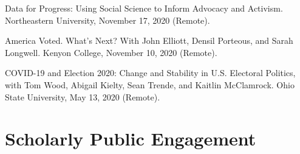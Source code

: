 \documentclass[letterpaper]{article}
\renewenvironment{itemize}{
  \begin{list}{}{
    \setlength{\leftmargin}{1.5em}
  }
}{
  \end{list}
}
\begin{document}
\begin{itemize}
\item Data for Progress: Using Social Science to Inform Advocacy and Activism. Northeastern University, November 17, 2020 (Remote). 

\item America Voted. What's Next? With John Elliott, Densil Porteous, and Sarah Longwell. Kenyon College, November 10, 2020 (Remote). 

\item COVID-19 and Election 2020: Change and Stability in U.S. Electoral Politics, with Tom Wood, Abigail Kielty, Sean Trende, and Kaitlin McClamrock. Ohio State University, May 13, 2020 (Remote).
 
\end{itemize}

\section*{Scholarly Public Engagement}
\end{document}
